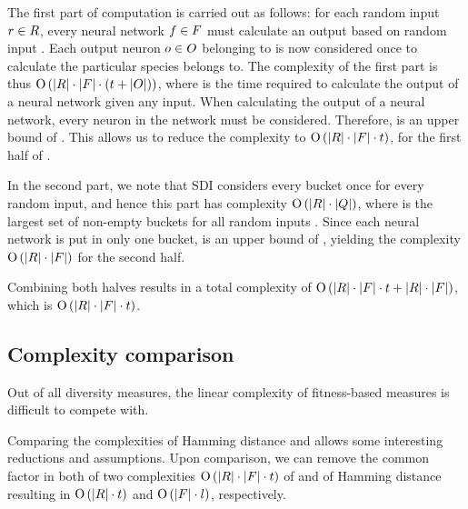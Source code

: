 The first part of computation is carried out as follows: for each random input $r \in R$, every neural network $f \in F$ must calculate an output based on random input \ran. Each output neuron $o \in O$ belonging to \ind{} is now considered once to calculate the particular species \ind{} belongs to. The complexity of the first part is thus $\operatorname{O}\left(\lvert R\rvert \cdot \lvert F\rvert \cdot \left(t + \lvert O\rvert\right)\right)$, where \timet{} is the time required to calculate the output of a neural network given any input. When calculating the output of a neural network, every neuron in the network must be considered. Therefore, \timet{} is an upper bound of \nnoutsetl. This allows us to reduce the complexity to $\operatorname{O}\left(\lvert R\rvert \cdot \lvert F\rvert \cdot t\right)$, for the first half of \dia.

In the second part, we note that SDI considers every bucket once for every random input, and hence this part has complexity $\operatorname{O}\left(\lvert R\rvert\cdot\lvert Q\rvert\right)$, where \nemptyspeciesset{} is the largest set of non-empty buckets for all random inputs \ranset. Since each neural network is put in only one bucket, \indsetl{} is an upper bound of \nemptyspeciessetl, yielding the complexity $\operatorname{O}\left(\lvert R\rvert\cdot\lvert F\rvert\right)$ for the second half.

Combining both halves results in a total complexity of $\operatorname{O}\left(\lvert R\rvert \cdot \lvert F\rvert \cdot t + \lvert R\rvert \cdot \lvert F\rvert\right)$, which is $\operatorname{O}\left(\lvert R\rvert\cdot\lvert F\rvert\cdot t\right)$.

\subsection{Complexity comparison}
Out of all diversity measures, the linear complexity of fitness-based measures is difficult to compete with.

Comparing the complexities of Hamming distance and \dia{} allows some interesting reductions and assumptions. Upon comparison, we can remove the common factor \indset{} in both of two complexities $\operatorname{O}\left(\lvert R\rvert\cdot\lvert F\rvert\cdot t\right)$ of \dia{} and \bigO{\indsetl^2 \cdot \bitstringl} of Hamming distance resulting in $\operatorname{O}\left(\lvert R\rvert \cdot t\right)$ and $\operatorname{O}\left(\lvert F\rvert \cdot l\right)$, respectively. 

